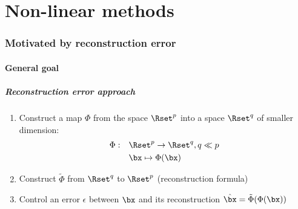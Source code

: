 \documentclass{beamer}\usepackage[]{graphicx}\usepackage[]{color}
\begin{document}
\part{Non-linear methods}
\begin{frame}
  \partpage
\end{frame}

\section{Motivated by reconstruction error}

\subsection{General goal}

\begin{frame}
  \frametitle{Reconstruction error approach}

  \begin{enumerate}
    \item  Construct a map $\Phi$ from the space $\Rset^{p}$ into a space $\Rset^{q}$ of \alert{smaller dimension}:
      \begin{align*}
      \Phi:\quad & \Rset^{p} \to \Rset^{q}, q \ll p\\
               & \bx \mapsto \Phi(\bx)
      \end{align*}
    \item Construct $\widetilde{\Phi}$ from $\Rset^{q}$ to $\Rset^{p}$ (\alert{reconstruction formula})
     \item Control an error $\epsilon$ between $\bx$ and its reconstruction $\hat \bx = \tilde{\Phi}(\Phi(\bx))$
  \end{enumerate}

\bigskip

\end{frame}
\end{document}
